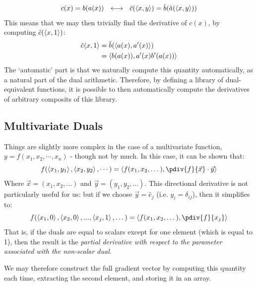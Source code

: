             \begin{equation}
                c(x) = b(a(x)) ~~\longleftrightarrow~~\tilde{c}(\left\langle x , y \right\rangle) = \tilde{b}(\tilde{a}(\left\langle x , y \right\rangle))
            \end{equation} 
            This means that we may then trivially find the derivative of $c(x)$, by computing $\tilde{c}(\left\langle x , 1 \right\rangle)$:
            \begin{align}
                \tilde{c}{\left\langle x , 1 \right\rangle} &= \tilde{b}(\left\langle a(x) , a^\prime(x) \right\rangle)
                \\
                & = \left\langle b(a(x)) , a^\prime(x) b^\prime(a(x)) \right\rangle
            \end{align}
            The `automatic' part is that we naturally compute this quantity automatically, as a natural part of the dual arithmetic. Therefore, by defining a library of dual-equivalent functions, it is possible to then automatically compute the derivatives of arbitrary composits of this library.

            \subsection{Multivariate Duals}

                Things are slightly more complex in the case of a multivariate function, $y = f(x_1,x_2,\cdots,x_n)$ - though not by much. In this case, it can be shown that:
                \begin{equation}
                    f(\dual{x_1}{y_1},\dual{x_2}{y_2},\cdots) = \dual{f(x_1,x_2,\dots)}{\pdiv{f}{\vec{x}} \cdot \vec{y}}
                \end{equation}
                Where $\vec{x} = (x_1,x_2,...)$ and $\vec{y} = (y_1,y_2,...)$. This directional derivative is not particularly useful for us: but if we choose $\vec{y} = \hat{e}_j$ (i.e. $y_i = \delta_{ij}$), then it simplifies to:
                \begin{equation}
                    f(\dual{x_1}{0},\dual{x_2}{0},...,\dual{x_j}{1},\dots) = \dual{f(x_1,x_2,\dots)}{\pdiv{f}{x_j} }
                \end{equation}
                That is, if the duals are equal to scalars except for one element (which is equal to 1), then the result is the \textit{partial derivative with respect to the parameter associated with the non-scalar dual}.

                We may therefore construct the full gradient vector by computing this quantity each time, extracting the second element, and storing it in an array. 

